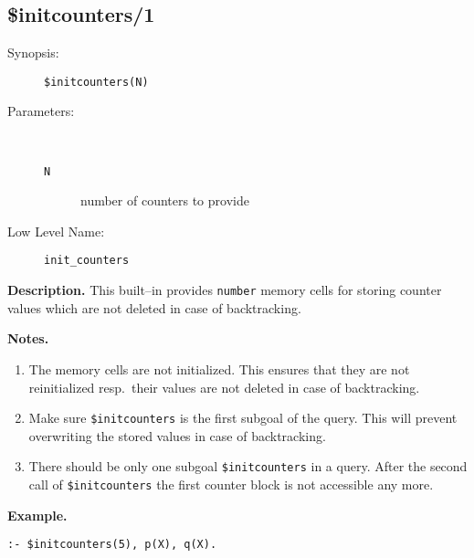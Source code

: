 %
%
%
\subsection{\$initcounters/1}

\begin{description}
\item[Synopsis:]
	{\tt \$initcounters(N)}
\item[Parameters:]\ \\[-0.5cm]
	\begin{description}
	\item[{\tt N}] number of counters to provide
	\end{description}
\item[Low Level Name:]
	{\tt init\_counters}
\end{description}

\vspace*{0.5cm}
\noindent
{\bf Description.}
This built--in provides {\tt number} memory cells for storing counter
values which are not deleted in case of backtracking.

\vspace*{0.5cm}
\noindent
{\bf Notes.}
\begin{enumerate}
\item{The memory cells are not initialized. This ensures that they are
      not reinitialized resp.\ their values are not deleted in case of
      backtracking.}
\item{Make sure {\tt \$initcounters} is the first subgoal of the
      query. This will prevent overwriting the stored values in case of
      backtracking.}
\item{There should be only one subgoal {\tt \$initcounters} in a
      query. After the second call of {\tt \$initcounters} the first
      counter block is not accessible any more.}
\end{enumerate}

\vspace*{0.5cm}
\noindent
{\bf Example.}
\begin{verbatim}
:- $initcounters(5), p(X), q(X).
\end{verbatim}

